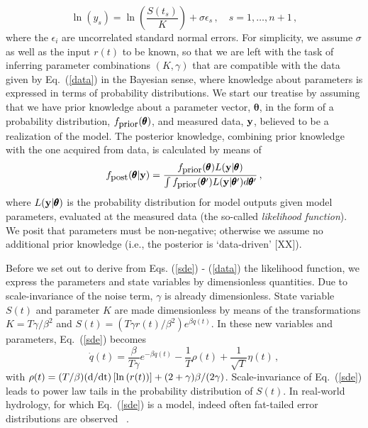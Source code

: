 \documentclass[11pt]{article}
\newcommand{\vc}[1]{{\bf #1 }}
\theoremstyle{definition}
\newcommand{\bt}{\pmb\theta}
\begin{document}
\begin{equation}\label{data}
  \ln \left( y_s \right)
  =
  \ln \left( \frac{S(t_s)}{K} \right)
  +
  \sigma\epsilon_s\,,\quad s=1,\dots,n+1\,,
\end{equation}
where the $\epsilon_i$ are uncorrelated standard normal errors.
For simplicity, we assume $\sigma$ as well as the input $r(t)$ to be known, so that we are left with the task of inferring parameter combinations $(K,\gamma)$ that are compatible with the data given by Eq.~(\ref{data}) in the Bayesian sense, where knowledge about parameters is expressed in terms of probability distributions.
We start our treatise by assuming that we have prior knowledge about a parameter vector, $\bt$, in the form of a probability distribution, $f_{\mbox{\small prior}}(\bt)$, and measured data, $\vc y$, believed to be a realization of the model.
The posterior knowledge, combining prior knowledge with the one acquired from data, is calculated by means of
\begin{equation}\label{Bayes}
  f_{\mbox{\small post}}(\bt|\vc y)
  =
  \frac{f_{\mbox{\small prior}}(\bt)L(\vc y|\bt)}
  {\int f_{\mbox{\small prior}}(\bt')L(\vc y|\bt')d\bt'}\,,
\end{equation}
where $L(\vc y|\bt)$ is the probability distribution for model outputs given model parameters, evaluated at the measured data (the so-called {\em likelihood function}).
We posit that parameters must be non-negative; otherwise we assume no additional prior knowledge (i.e., the posterior is ‘data-driven’ [XX]).

Before we set out to derive from Eqs. (\ref{sde}) - (\ref{data}) the likelihood function, we express the parameters and state variables by dimensionless quantities.
Due to scale-invariance of the noise term, $\gamma$ is already dimensionless. State variable $S(t)$ and parameter $K$ are made dimensionless by means of the transformations $K=T\gamma/\beta^2$ and $S(t)=(T\gamma r(t)/\beta^2)e^{\beta q(t)}$.
In these new variables and parameters, Eq.~(\ref{sde}) becomes
\begin{equation}
  \dot q(t)
  =
  \frac{\beta}{T\gamma}e^{-\beta q(t)}
  -
  \frac{1}{T}\rho(t)
  +
  \frac{1}{\sqrt{T}}\eta(t)\,,
\end{equation}
with $\rho(t)  =  (T/\beta)(\mbox d/\mbox{dt})\left[ \ln \left( r(t) \right) \right]
  +
  (2+\gamma)\beta/(2\gamma)$.
Scale-invariance of Eq.~(\ref{sde}) leads to power law tails in the probability distribution of $S(t)$. In real-world hydrology, for which Eq.~(\ref{sde}) is a model, indeed often fat-tailed error distributions are observed ~\cite{thyer_2009_fattails}.
\end{document}
